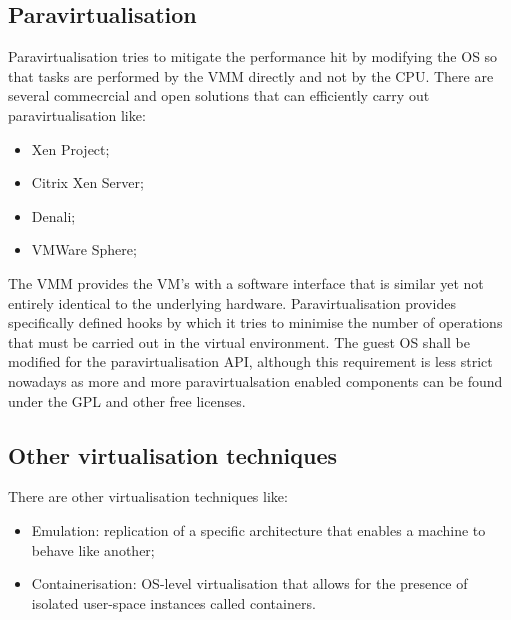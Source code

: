 \subsection{Paravirtualisation}
Paravirtualisation tries to mitigate the performance hit by modifying the OS so that tasks are performed by the VMM
directly and not by the CPU. There are several commecrcial and open solutions that can efficiently carry out
paravirtualisation like:
\begin{itemize} 
    \item Xen Project;
    \item Citrix Xen Server;
    \item Denali;
    \item VMWare Sphere;
\end{itemize} 
The VMM provides the VM's with a software interface that is similar yet not entirely identical to the underlying
hardware. Paravirtualisation provides specifically defined hooks by which it tries to minimise the number of
operations that must be carried out in the virtual environment. The guest OS shall be modified for the
paravirtualisation API, although this requirement is less strict nowadays as more and more paravirtualsation
enabled components can be found under the GPL and other free licenses.
\subsection{Other virtualisation techniques}
There are other virtualisation techniques like: 
\begin{itemize} 
    \item Emulation: replication of a specific architecture that enables a machine to behave like another;
    \item Containerisation: OS-level virtualisation that allows for the presence of isolated user-space instances 
        called containers.  
\end{itemize} 
